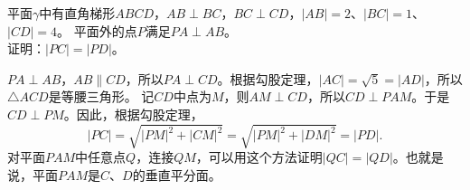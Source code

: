 \documentclass[12pt,UTF8]{ctexbook}
\begin{document}
\begin{et}\label{et:1-3-20}
    平面$\gamma$中有直角梯形$ABCD$，$AB \perp BC$，$BC \perp CD$，$|AB|= 2$、$|BC| = 1$、$|CD| = 4$。
    平面外的点$P$满足$PA \perp AB$。\\
    证明：$|PC| = |PD|$。
\end{et}
\begin{so}
    $PA \perp AB$，$AB \parallel CD$，所以$PA \perp CD$。根据勾股定理，$|AC| = \sqrt{5} = |AD|$，所以$\triangle ACD$是等腰三角形。
    记$CD$中点为$M$，则$AM \perp CD$，所以$CD \perp PAM$。于是$CD \perp PM$。因此，根据勾股定理，
    $$ |PC| = \sqrt{|PM|^2 + |CM|^2} = \sqrt{|PM|^2 + |DM|^2} = |PD|.$$
    对平面$PAM$中任意点$Q$，连接$QM$，可以用这个方法证明$|QC| = |QD|$。也就是说，平面$PAM$是$C$、$D$的垂直平分面。\\

\end{so}
\end{document}
